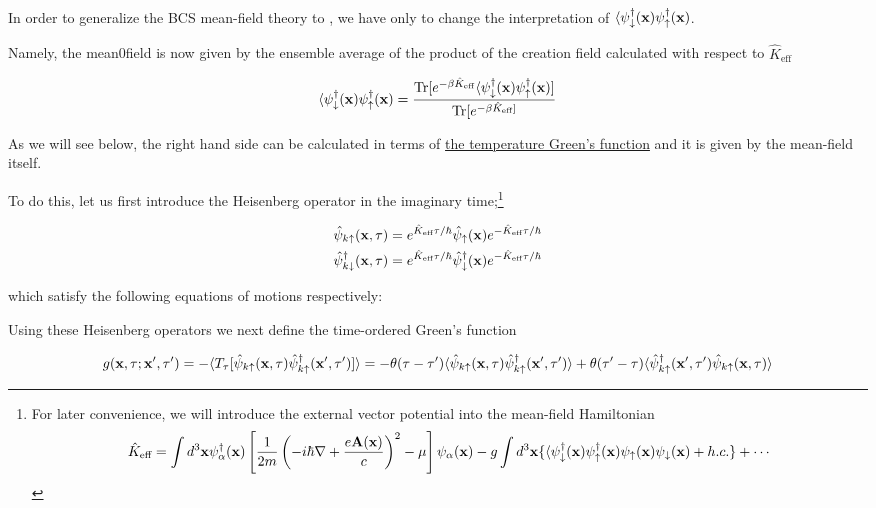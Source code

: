 \dotfill

\ 

In order to generalize the BCS mean-field theory to {}, we have only to change the interpretation of $\langle\psi_{\downarrow}^\dagger({\bf x})\psi_{\uparrow}^\dagger({\bf x})$. 

Namely, the mean0field is now given by the ensemble average of the product of the creation field calculated with respect to $\hat{K}_{\text{eff}}$

\[\langle\psi_{\downarrow}^\dagger({\bf x})\psi_{\uparrow}^\dagger({\bf x}) = \frac{\text{Tr}[e^{-\beta\hat{K}_{\text{eff}}}\langle\psi_{\downarrow}^\dagger({\bf x})\psi_{\uparrow}^\dagger({\bf x})]}{\text{Tr}[e^{-\beta\hat{K}_{\text{eff}}]}} \]

As we will see below, the right hand side can be calculated in terms of \uline{the temperature Green's function} and it is given by the mean-field itself. 

To do this, let us first introduce the Heisenberg operator in the imaginary time;\footnote{For later convenience, we will introduce the external vector potential into the mean-field Hamiltonian
\[\hat{K}_{\text{eff}}=\int d^3{\bf x}\psi_{\alpha}^\dagger({\bf x})\left[\frac{1}{2m}\left(-i\hbar\nabla+\frac{e{\bf A}({\bf x})}{c}\right)^2-\mu\right]\psi_{\alpha}({\bf x}) - g\int d^3{\bf x}\{\langle\psi_{\downarrow}^\dagger({\bf x})\psi_{\uparrow}^\dagger({\bf x})\psi_{\uparrow}({\bf x})\psi_{\downarrow}({\bf x})+ h.c.\}+\cdots \]}

\[\begin{split}
\hat{\psi}_{k\uparrow}({\bf x},\tau) &= e^{\hat{K}_{\text{eff}}\tau/\hbar}\hat{\psi}_{\uparrow}({\bf x})e^{-\hat{K}_{\text{eff}}\tau/\hbar}\\
\hat{\psi}^\dagger_{k\downarrow}({\bf x},\tau) &= e^{\hat{K}_{\text{eff}}\tau/\hbar}\hat{\psi}^\dagger_{\downarrow}({\bf x})e^{-\hat{K}_{\text{eff}}\tau/\hbar}
\end{split} \]

which satisfy the following  equations of motions respectively:%

Using these Heisenberg operators we next define the time-ordered Green's function

\[g({\bf x},\tau;{\bf x}',\tau') = -\langle T_{\tau}[\hat{\psi}_{k\uparrow}({\bf x},\tau)\hat{\psi}^\dagger_{k\uparrow}({\bf x}',\tau')]\rangle = -\theta(\tau-\tau')\langle\hat{\psi}_{k\uparrow}({\bf x},\tau)\hat{\psi}^\dagger_{k\uparrow}({\bf x}',\tau')\rangle + \theta(\tau'-\tau)\langle\hat{\psi}^\dagger_{k\uparrow}({\bf x}',\tau')\hat{\psi}_{k\uparrow}({\bf x},\tau)\rangle\]


